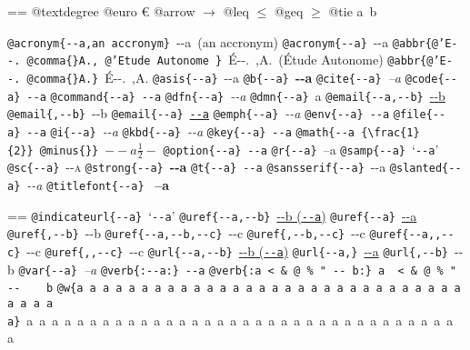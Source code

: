\documentclass{book}
\makeatletter
\newcommand\GNUTexinfocommandstyletextcite[1]{{\normalfont{}\textsl{#1}}}%
\newcommand\GNUTexinfocommandstyletextkbd[1]{{\ttfamily\textsl{#1}}}%
\newcommand\GNUTexinfocommandstyletextvar[1]{{\normalfont{}\textsl{#1}}}%
\newenvironment{GNUTexinfopreformatted}{%
  \par\GNUTobeylines\obeyspaces\frenchspacing
  \parskip=\z@\parindent=\z@}{}
{\catcode`\^^M=13 \gdef\GNUTobeylines{\catcode`\^^M=13 \def^^M{\null\par}}}
\newenvironment{GNUTexinfoindented}
  {\begin{list}{}{}
  \item\relax}
  {\end{list}}
\makeatother
\begin{document}
\begin{GNUTexinfoindented}
\begin{GNUTexinfopreformatted}
@textdegree \textdegree{}
@euro \euro{}
@arrow $\rightarrow{}$
@leq $\leq{}$
@geq $\geq{}$
@tie a~b

\texttt{@acronym\{{-}{-}a,an accronym\}}\ {-}{-}a\ (an accronym)
\texttt{@acronym\{{-}{-}a\}}\ {-}{-}a
\texttt{@abbr\{@'E{-}{-}.\ @comma\{\}A.,\ @'Etude Autonome \}}\ \'{E}{-}{-}.\@\ ,A.\@\ (\'{E}tude Autonome)
\texttt{@abbr\{@'E{-}{-}.\ @comma\{\}A.\}}\ \'{E}{-}{-}.\@\ ,A.\@
\texttt{@asis\{{-}{-}a\}}\ {-}{-}a
\texttt{@b\{{-}{-}a\}}\ \textbf{{-}{-}a}
\texttt{@cite\{{-}{-}a\}}\ \GNUTexinfocommandstyletextcite{--a}
\texttt{@code\{{-}{-}a\}}\ \texttt{{-}{-}a}
\texttt{@command\{{-}{-}a\}}\ \texttt{{-}{-}a}
\texttt{@dfn\{{-}{-}a\}}\ \textsl{{-}{-}a}
\texttt{@dmn\{{-}{-}a\}}\ \thinspace {-}{-}a
\texttt{@email\{{-}{-}a,{-}{-}b\}}\ \href{mailto:--a}{{-}{-}b}
\texttt{@email\{,{-}{-}b\}}\ {-}{-}b
\texttt{@email\{{-}{-}a\}}\ \href{mailto:--a}{\nolinkurl{--a}}
\texttt{@emph\{{-}{-}a\}}\ \emph{{-}{-}a}
\texttt{@env\{{-}{-}a\}}\ \texttt{{-}{-}a}
\texttt{@file\{{-}{-}a\}}\ \texttt{{-}{-}a}
\texttt{@i\{{-}{-}a\}}\ \textit{{-}{-}a}
\texttt{@kbd\{{-}{-}a\}}\ \GNUTexinfocommandstyletextkbd{{-}{-}a}
\texttt{@key\{{-}{-}a\}}\ \texttt{{-}{-}a}
\texttt{@math\{{-}{-}a \{\textbackslash{}frac\{1\}\{2\}\}\ @minus\{\}\}}\ $--a {\frac{1}{2}} -$
\texttt{@option\{{-}{-}a\}}\ \texttt{{-}{-}a}
\texttt{@r\{{-}{-}a\}}\ \textnormal{--a}
\texttt{@samp\{{-}{-}a\}}\ `\texttt{{-}{-}a}'
\texttt{@sc\{{-}{-}a\}}\ \textsc{{-}{-}a}
\texttt{@strong\{{-}{-}a\}}\ \textbf{{-}{-}a}
\texttt{@t\{{-}{-}a\}}\ \texttt{{-}{-}a}
\texttt{@sansserif\{{-}{-}a\}}\ \textsf{{-}{-}a}
\texttt{@slanted\{{-}{-}a\}}\ \textsl{{-}{-}a}
\texttt{@titlefont\{{-}{-}a\}}\ \end{GNUTexinfopreformatted}
{\huge \bfseries --a}\begin{GNUTexinfopreformatted}%
\ttfamily 
\texttt{@indicateurl\{{-}{-}a\}}\ `\texttt{{-}{-}a}'
\texttt{@uref\{{-}{-}a,{-}{-}b\}}\ \href{--a}{{-}{-}b (\nolinkurl{--a})}
\texttt{@uref\{{-}{-}a\}}\ \url{--a}
\texttt{@uref\{,{-}{-}b\}}\ {-}{-}b
\texttt{@uref\{{-}{-}a,{-}{-}b,{-}{-}c\}}\ {-}{-}c
\texttt{@uref\{,{-}{-}b,{-}{-}c\}}\ {-}{-}c
\texttt{@uref\{{-}{-}a{,}{,}{-}{-}c\}}\ {-}{-}c
\texttt{@uref\{{,}{,}{-}{-}c\}}\ {-}{-}c
\texttt{@url\{{-}{-}a,{-}{-}b\}}\ \href{--a}{{-}{-}b (\nolinkurl{--a})}
\texttt{@url\{{-}{-}a,\}}\ \url{--a}
\texttt{@url\{,{-}{-}b\}}\ {-}{-}b
\texttt{@var\{{-}{-}a\}}\ \GNUTexinfocommandstyletextvar{--a}
\texttt{@verb\{:{-}{-}a:\}}\ \verb:--a:
\texttt{@verb\{:a  < \& @\ \% " {-}{-}    b:\}}\ \verb:a  < & @ % " --    b:
\texttt{@w\{a a a a a a a a a a a a a a a a a a a a a a a a a a a a a a a a a a a\}}\ \hbox{a a a a a a a a a a a a a a a a a a a a a a a a a a a a a a a a a a a}

\end{GNUTexinfopreformatted}
\end{GNUTexinfoindented}
\end{document}
